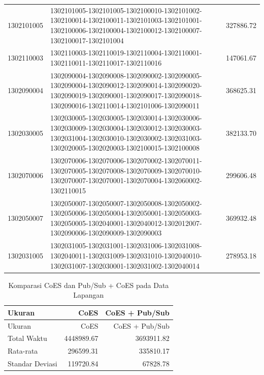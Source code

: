 \begin{longtable}[h]{lp{8cm}r}
		1302101005 & 1302101005-1302101005-1302100010-1302101002-1302100014-1302100011-1302101003-1302101001-1302100006-1302100004-1302100012-1302100007-1302100017-1302101004 & 327886.72 \\
		1302110003 & 1302110003-1302110019-1302110004-1302110001-1302110011-1302110017-1302110016 & 147061.67 \\
		1302090004 & 1302090004-1302090008-1302090002-1302090005-1302090004-1302090012-1302090014-1302090020-1302090019-1302090001-1302090017-1302090018-1302090016-1302110014-1302101006-1302090011 & 368625.31 \\
		1302030005 & 1302030005-1302030005-1302030014-1302030006-1302030009-1302030004-1302030012-1302030003-1302031004-1302030010-1302030002-1302031003-1302020005-1302020003-1302100015-1302100008 & 382133.70 \\
		1302070006 & 1302070006-1302070006-1302070002-1302070011-1302070005-1302070008-1302070009-1302070010-1302070007-1302070001-1302070004-1302060002-1302110015 & 299606.48 \\
		1302050007 & 1302050007-1302050007-1302050008-1302050002-1302050006-1302050004-1302050001-1302050003-1302050005-1302040001-1302040012-1302012007-1302090006-1302090009-1302090003 & 369932.48 \\
		1302031005 & 1302031005-1302031001-1302031006-1302031008-1302040011-1302031009-1302031010-1302040010-1302031007-1302030001-1302031002-1302040014 & 278953.18 \\
\end{longtable}


\begin{longtable}[h]{lrr}
	\caption{Komparasi CoES dan Pub/Sub + CoES pada Data Lapangan}
	\label{tbl:test_result_enumerator_quit_field}\\
	\toprule
		Ukuran & CoES & CoES + Pub/Sub\\ 
	\midrule
	\endfirsthead
	\toprule
		Ukuran & CoES & CoES + Pub/Sub\\ 
	\midrule
	\endhead
	\bottomrule
	\endfoot
		Total Waktu & 4448989.67 & 3693911.82\\
		Rata-rata & 296599.31 & 335810.17\\
		Standar Deviasi & 119720.84 & 67828.78\\
\end{longtable}

